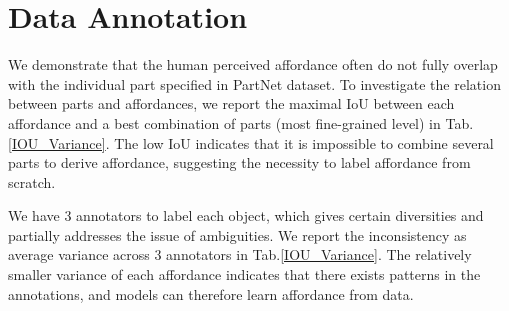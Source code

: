 \documentclass[final]{cvpr}
\begin{document}
\section{Data Annotation}\label{sec:annotation}
\begin{table}[!htb]
\caption{IOU between each affordance and a best combination of parts. Variance of each affordance category. Numbers of IOU are in .}
\label{IOU_Variance}
\vspace{-0.4cm}
\end{table}
We demonstrate that the human perceived affordance often do not fully overlap with the individual part specified in PartNet dataset. To investigate the relation between parts and affordances, we report the maximal IoU between each affordance and a best combination of parts (most fine-grained level) in Tab.\ref{IOU_Variance}. The low IoU indicates that it is impossible to combine several parts to derive affordance, suggesting the necessity to label affordance from scratch.

{We have 3 annotators to label each object, which gives certain diversities and partially addresses the issue of ambiguities. We report the inconsistency as average variance across 3 annotators in Tab.\ref{IOU_Variance}. The relatively smaller variance of each affordance indicates that there exists patterns in the annotations, and models can therefore learn affordance from data.}
\end{document}
